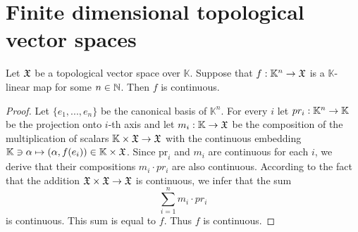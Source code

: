 \section{Finite dimensional topological vector spaces}

\begin{fact}\label{fact:linear_morphisms_from_standard_finite_spaces_are_always_continuous}
   Let ${\mathfrak X}$ be a topological vector space over $\mathbb{K}$. Suppose that $f:\mathbb{K}^n \rightarrow {\mathfrak X}$ is a $\mathbb{K}$-linear map for some $n\in {\mathbb N}$. Then $f$ is continuous.
\end{fact}
\begin{proof}
   Let $\{e_1,...,e_n\}$ be the canonical basis of $\mathbb{K}^n$. For every $i$ let $pr_i:\mathbb{K}^n\rightarrow \mathbb{K}$ be the projection onto $i$-th axis and let $m_{i}:\mathbb{K}\rightarrow {\mathfrak X}$ be the composition of the multiplication of scalars $\mathbb{K}\times {\mathfrak X}\rightarrow {\mathfrak X}$ with the continuous embedding $\mathbb{K} \ni \alpha \mapsto \left(\alpha, f(e_i)\right) \in \mathbb{K}\times {\mathfrak X}$. Since $\mathrm{pr}_i$ and $m_{i}$ are continuous for each $i$, we derive that their compositions $m_{i}\cdot pr_i$ are also continuous. According to the fact that the addition ${\mathfrak X}\times {\mathfrak X}\rightarrow {\mathfrak X}$ is continuous, we infer that the sum
   $$\sum_{i=1}^n m_{i}\cdot pr_{i}$$
   is continuous. This sum is equal to $f$. Thus $f$ is continuous.
\end{proof}

